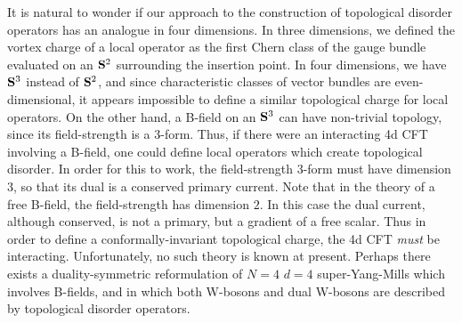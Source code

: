 \documentclass[a4paper,12pt, amsfonts, amssymb]{article}
\begin{document}
It is natural to wonder if our approach to the construction of 
topological disorder operators has an analogue in four dimensions. In three
dimensions, we defined the vortex charge of a local operator as the first
Chern class of the gauge bundle evaluated on an ${\bf S}^2$ surrounding the
insertion point. In four dimensions, we have ${\bf S}^3$ instead of 
${\bf S}^2$, and since characteristic classes of vector bundles are even-dimensional, it appears impossible to define a similar topological charge for local operators. On the other hand, a B-field on an ${\bf S}^3$
can have non-trivial topology, since its field-strength is a 3-form.
Thus, if there were an interacting 4d CFT involving a B-field, one could
define local operators which create topological disorder. In order for this to work, the field-strength 3-form must have dimension $3$, so that its
dual is a conserved primary current. Note that in the theory of a free
B-field, the field-strength has dimension $2$. In this case the dual current, although conserved, is not a primary, but a gradient of a free scalar. 
Thus in order to define a conformally-invariant
topological charge, the 4d CFT {\it must} be interacting. Unfortunately,
no such theory is known at present. Perhaps there exists a duality-symmetric 
reformulation of $N=4$ $d=4$ super-Yang-Mills which involves B-fields,
and in which both W-bosons and dual W-bosons are described by 
topological disorder operators.
\end{document}
